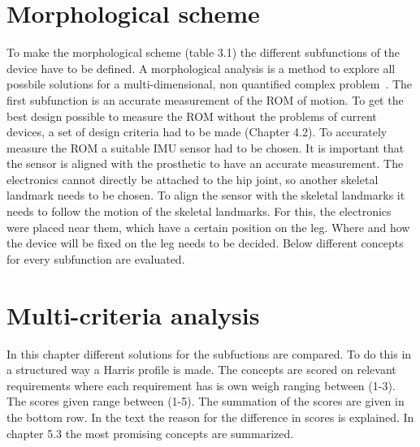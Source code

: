 \documentclass[whitelogo]{tudelft-report}
\begin{document}
{{{\section{Morphological scheme}
To make the morphological scheme (table 3.1) the different subfunctions of the device have to be defined. A morphological analysis is a method to explore all possbile solutions for a multi-dimensional, non quantified complex problem~\cite{ritchey1998general}. The first subfunction is an accurate measurement of the ROM of motion. To get the best design possible to measure the ROM without the problems of current devices, a set of design criteria had to be made (Chapter 4.2). To accurately measure the ROM a suitable IMU sensor had to be chosen. It is important that the sensor is aligned with the prosthetic to have an accurate measurement. The electronics cannot directly be attached to the hip joint, so another skeletal landmark needs to be chosen. To align the sensor with the skeletal landmarks it needs to follow the motion of the skeletal landmarks. For this, the electronics were placed near them, which have a certain position on the leg. Where and how the device will be fixed on the leg needs to be decided. Below different concepts for every subfunction are evaluated.

\section{Multi-criteria analysis}
In this chapter different solutions for the subfuctions are compared. To do this in a structured way a Harris profile is made. The concepts are scored on relevant requirements where each requirement has is own weigh ranging between (1-3). The scores given range between (1-5). The summation of the scores are given in the bottom row. In the text the reason for the difference in scores is explained. In chapter 5.3 the most promising concepts are summarized.

}}}
\end{document}
